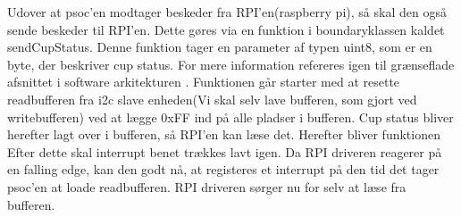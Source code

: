 \documentclass[Softwaredesign/Softwaredesign_main.tex]{subfiles}
\begin{document}
Udover at psoc'en modtager beskeder fra RPI'en(raspberry pi), så skal den også sende beskeder til RPI'en. Dette gøres  via en funktion i boundaryklassen kaldet sendCupStatus. Denne funktion tager en parameter af typen uint8, som er en byte, der beskriver cup status. For mere information refereres igen til grænseflade afsnittet i software arkitekturen . Funktionen går starter med at resette readbufferen fra i2c slave enheden(Vi skal selv lave bufferen, som gjort ved writebufferen) ved at lægge 0xFF ind på alle pladser i bufferen. Cup status bliver herefter lagt over i bufferen, så RPI'en kan læse det. Herefter bliver funktionen  Efter dette skal interrupt benet trækkes lavt igen. Da RPI driveren reagerer på en falling edge, kan den godt nå, at registeres et interrupt på den tid det tager psoc'en at loade readbufferen. RPI driveren sørger nu for selv at læse fra bufferen. 
\end{document}
